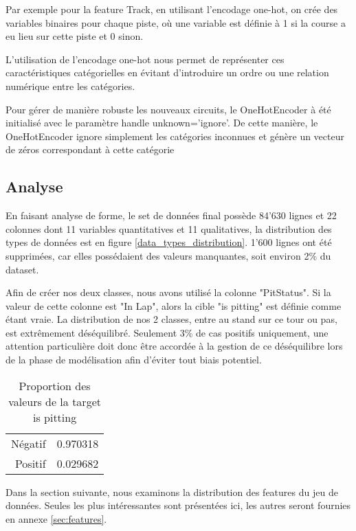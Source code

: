 Par exemple pour la feature Track, en utilisant l'encodage one-hot, on crée des variables binaires pour chaque piste, où une variable est définie à 1 si la course a eu lieu sur cette piste et 0 sinon.

L'utilisation de l'encodage one-hot nous permet de représenter ces caractéristiques catégorielles en évitant d'introduire un ordre ou une relation numérique entre les catégories.

Pour gérer de manière robuste les nouveaux circuits, le OneHotEncoder à été initialisé avec le paramètre handle unknown='ignore'.
De cette manière, le OneHotEncoder ignore simplement les catégories inconnues et génère un vecteur de zéros correspondant à cette catégorie

\subsection{Analyse}

En faisant analyse de forme, le set de données final possède 84'630 lignes et 22 colonnes dont 11 variables quantitatives et 11 qualitatives, la distribution des types de données est en figure \ref{data_types_distribution}.
1'600 lignes ont été supprimées, car elles possédaient des valeurs manquantes, soit environ 2\% du dataset.

Afin de créer nos deux classes, nous avons utilisé la colonne "PitStatus". Si la valeur de cette colonne est "In Lap", alors la cible "is pitting" est définie comme étant vraie.
La distribution de nos 2 classes, entre au stand sur ce tour ou pas, est extrêmement déséquilibré.
Seulement 3\% de cas positifs uniquement, une attention particulière doit donc être accordée à la gestion de ce déséquilibre
lors de la phase de modélisation afin d'éviter tout biais potentiel.

\begin{table}[H]
    \begin{center}
        \caption{Proportion des valeurs de la target is pitting}
        \begin{tabular}{r|l}
            Négatif & 0.970318 \\
            Positif & 0.029682
        \end{tabular}
    \end{center}
\end{table}

Dans la section suivante, nous examinons la distribution des features du jeu de données.
Seules les plus intéressantes sont présentées ici, les autres seront fournies en annexe \ref{sec:features}.

